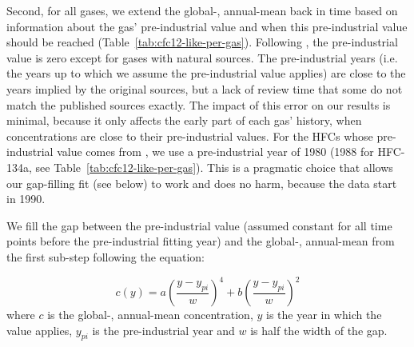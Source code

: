Second, for all gases, we extend the global-, annual-mean back in time
based on information about the gas' pre-industrial value
and when this pre-industrial value should be reached (Table~\ref{tab:cfc12-like-per-gas}).
Following \citet{meinshausen_historical-ghgs_2017}, the pre-industrial value is zero
except for gases with natural sources.
The pre-industrial years (i.e. the years up to which we assume the pre-industrial value applies)
are close to the years implied by the original sources,
but a lack of review time that some do not match the published sources exactly.
The impact of this error on our results is minimal,
because it only affects the early part of each gas' history,
when concentrations are close to their pre-industrial values.
For the HFCs whose pre-industrial value comes from \citet{velders_hfcs_2022},
we use a pre-industrial year of 1980 (1988 for HFC-134a, see Table~\ref{tab:cfc12-like-per-gas}).
This is a pragmatic choice that allows our gap-filling fit (see below) to work
and does no harm, because the \citet{velders_hfcs_2022} data start in 1990.

We fill the gap between the pre-industrial value (assumed constant for all time points before the pre-industrial fitting year)
and the global-, annual-mean from the first sub-step following the equation:

\begin{equation}
    \label{eq:cfc12-like-global-mean-gap-fill}
    c(y) = a \left( \frac{y - y_{pi}}{w} \right)^4 + b \left( \frac{y - y_{pi}}{w} \right)^2
\end{equation}
where $c$ is the global-, annual-mean concentration,
$y$ is the year in which the value applies,
$y_{pi}$ is the pre-industrial year
and $w$ is half the width of the gap.

